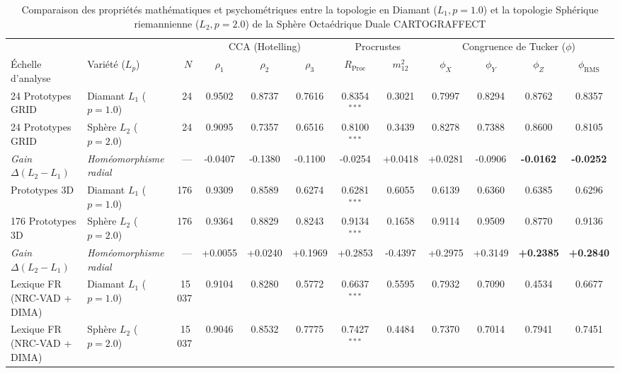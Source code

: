 \begin{table}[htbp]
\centering
\begin{threeparttable}
\caption{Comparaison des propriétés mathématiques et psychométriques entre la topologie en Diamant ($L_1, p = 1.0$) et la topologie Sphérique riemannienne ($L_2, p = 2.0$) de la Sphère Octaédrique Duale CARTOGRAFFECT}
\label{tab:cartograffect_l1_vs_l2_comparison}
\footnotesize
\begin{tabular}{l l r ccc cc cccc}
\toprule
 & & & \multicolumn{3}{c}{CCA (Hotelling)} & \multicolumn{2}{c}{Procrustes} & \multicolumn{4}{c}{Congruence de Tucker ($\phi$)} \\
\cmidrule(lr){4-6} \cmidrule(lr){7-8} \cmidrule(l){9-12}
Échelle d'analyse & Variété ($L_p$) & $N$ & $\rho_1$ & $\rho_2$ & $\rho_3$ & $R_{\text{Proc}}$ & $m_{12}^2$ & $\phi_X$ & $\phi_Y$ & $\phi_Z$ & $\phi_{\text{RMS}}$ \\
\midrule
24 Prototypes GRID & Diamant $L_1$ ($p=1.0$) & 24 & 0.9502 & 0.8737 & 0.7616 & 0.8354$^{***}$ & 0.3021 & 0.7997 & 0.8294 & 0.8762 & 0.8357 \\
24 Prototypes GRID & Sphère $L_2$ ($p=2.0$) & 24 & 0.9095 & 0.7357 & 0.6516 & 0.8100$^{***}$ & 0.3439 & 0.8278 & 0.7388 & 0.8600 & 0.8105 \\
\textit{Gain $\Delta(L_2 - L_1)$} & \textit{Homéomorphisme radial} & --- & -0.0407 & -0.1380 & -0.1100 & -0.0254 & +0.0418 & +0.0281 & -0.0906 & \textbf{-0.0162} & \textbf{-0.0252} \\
\addlinespace[3pt]
176 Prototypes 3D & Diamant $L_1$ ($p=1.0$) & 176 & 0.9309 & 0.8589 & 0.6274 & 0.6281$^{***}$ & 0.6055 & 0.6139 & 0.6360 & 0.6385 & 0.6296 \\
176 Prototypes 3D & Sphère $L_2$ ($p=2.0$) & 176 & 0.9364 & 0.8829 & 0.8243 & 0.9134$^{***}$ & 0.1658 & 0.9114 & 0.9509 & 0.8770 & 0.9136 \\
\textit{Gain $\Delta(L_2 - L_1)$} & \textit{Homéomorphisme radial} & --- & +0.0055 & +0.0240 & +0.1969 & +0.2853 & -0.4397 & +0.2975 & +0.3149 & \textbf{+0.2385} & \textbf{+0.2840} \\
\addlinespace[3pt]
Lexique FR (NRC-VAD + DIMA) & Diamant $L_1$ ($p=1.0$) & 15\,037 & 0.9104 & 0.8280 & 0.5772 & 0.6637$^{***}$ & 0.5595 & 0.7932 & 0.7090 & 0.4534 & 0.6677 \\
Lexique FR (NRC-VAD + DIMA) & Sphère $L_2$ ($p=2.0$) & 15\,037 & 0.9046 & 0.8532 & 0.7775 & 0.7427$^{***}$ & 0.4484 & 0.7370 & 0.7014 & 0.7941 & 0.7451 \\

\end{tabular}
\end{threeparttable}
\end{table}
